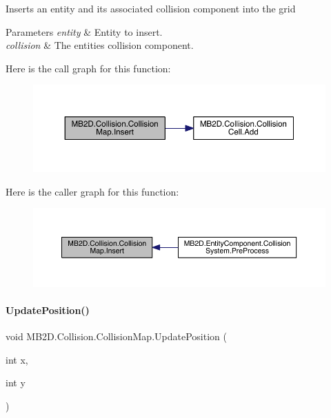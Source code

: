 Inserts an entity and its associated collision component into the grid 


\begin{DoxyParams}{Parameters}
{\em entity} & Entity to insert.\\
\hline
{\em collision} & The entities collision component.\\
\hline
\end{DoxyParams}
Here is the call graph for this function\+:
\nopagebreak
\begin{figure}[H]
\begin{center}
\leavevmode
\includegraphics[width=350pt]{class_m_b2_d_1_1_collision_1_1_collision_map_a7d53571c049d50d62e6132413fe712e3_cgraph}
\end{center}
\end{figure}
Here is the caller graph for this function\+:
\nopagebreak
\begin{figure}[H]
\begin{center}
\leavevmode
\includegraphics[width=350pt]{class_m_b2_d_1_1_collision_1_1_collision_map_a7d53571c049d50d62e6132413fe712e3_icgraph}
\end{center}
\end{figure}
\hypertarget{class_m_b2_d_1_1_collision_1_1_collision_map_a8f34c934947ce25d7de681fc07f14e09}{}\label{class_m_b2_d_1_1_collision_1_1_collision_map_a8f34c934947ce25d7de681fc07f14e09} 
\paragraph{\texorpdfstring{Update\+Position()}{UpdatePosition()}}
{\footnotesize\ttfamily void M\+B2\+D.\+Collision.\+Collision\+Map.\+Update\+Position (\begin{DoxyParamCaption}\item[{int}]{x,  }\item[{int}]{y }\end{DoxyParamCaption})\hspace{0.3cm}{\ttfamily [inline]}}



